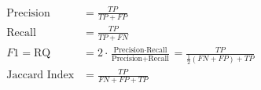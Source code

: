\begin{subequations}
    \begin{align}
        \text{Precision}     & = \frac{TP}{TP + FP} \label{eq:precision}                                                                                                     \\
        \text{Recall}        & = \frac{TP}{TP + FN} \label{eq:recall}                                                                                                        \\
        F1 = \text{RQ}       & = 2 \cdot \frac{\text{Precision} \cdot \text{Recall}}{\text{Precision} + \text{Recall}}\label{eq:f1}  = \frac{TP}{\frac{1}{2} (FN + FP) + TP} \\
        \text{Jaccard Index} & = \frac{TP}{FN + FP + TP} \label{eq:jaccard}                                                                                                  \\
    \end{align}
\end{subequations}
